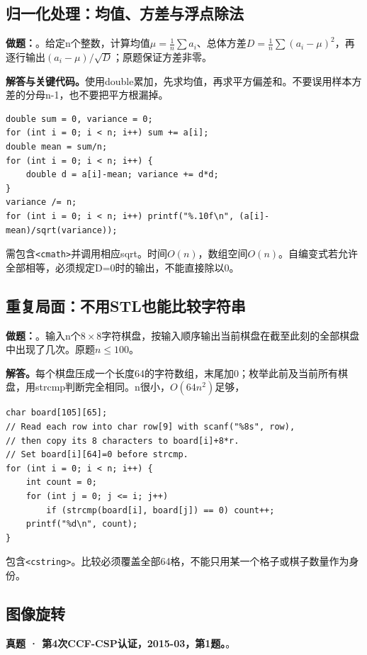 \subsection{归一化处理：均值、方差与浮点除法}

\noindent\textbf{做题：}。给定n个整数，计算均值$\mu=\frac1n\sum a_i$、总体方差$D=\frac1n\sum(a_i-\mu)^2$，再逐行输出$(a_i-\mu)/\sqrt D$；原题保证方差非零。

\noindent\textbf{解答与关键代码。}使用double累加，先求均值，再求平方偏差和。不要误用样本方差的分母n-1，也不要把平方根漏掉。
\begin{lstlisting}
double sum = 0, variance = 0;
for (int i = 0; i < n; i++) sum += a[i];
double mean = sum/n;
for (int i = 0; i < n; i++) {
    double d = a[i]-mean; variance += d*d;
}
variance /= n;
for (int i = 0; i < n; i++) printf("%.10f\n", (a[i]-mean)/sqrt(variance));
\end{lstlisting}
需包含\texttt{<cmath>}并调用相应sqrt。时间$O(n)$，数组空间$O(n)$。自编变式若允许全部相等，必须规定D=0时的输出，不能直接除以0。
\subsection{重复局面：不用STL也能比较字符串}

\noindent\textbf{做题：}。输入n个$8\times8$字符棋盘，按输入顺序输出当前棋盘在截至此刻的全部棋盘中出现了几次。原题$n\le100$。

\noindent\textbf{解答。}每个棋盘压成一个长度64的字符数组，末尾加0；枚举此前及当前所有棋盘，用strcmp判断完全相同。n很小，$O(64n^2)$足够，
\begin{lstlisting}
char board[105][65];
// Read each row into char row[9] with scanf("%8s", row),
// then copy its 8 characters to board[i]+8*r.
// Set board[i][64]=0 before strcmp.
for (int i = 0; i < n; i++) {
    int count = 0;
    for (int j = 0; j <= i; j++)
        if (strcmp(board[i], board[j]) == 0) count++;
    printf("%d\n", count);
}
\end{lstlisting}
包含\texttt{<cstring>}。比较必须覆盖全部64格，不能只用某一个格子或棋子数量作为身份。

\subsection{图像旋转}
\textbf{真题 · 第4次CCF-CSP认证，2015-03，第1题。}。

